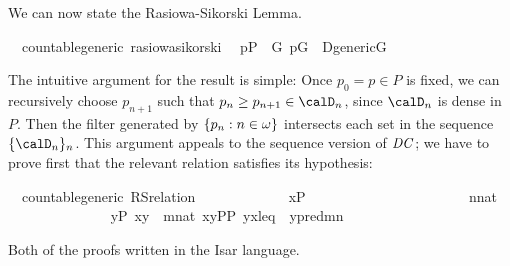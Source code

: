 We can now state the Rasiowa-Sikorski Lemma.
\begin{isabelle}%
\isamarkupfalse%
\ {\isacharparenleft}\ countable{\isacharunderscore}generic{\isacharparenright}\ rasiowa{\isacharunderscore}sikorski{\isacharcolon}\isanewline
\ \ {\isachardoublequoteopen}p{\isasymin}P\ {\isasymLongrightarrow}\ {\isasymexists}G{\isachardot}\ p{\isasymin}G\ {\isasymand}\ D{\isacharunderscore}generic{\isacharparenleft}G{\isacharparenright}{\isachardoublequoteclose}
\end{isabelle}

The intuitive argument for the result is simple: Once $p_0=p\in P$ is
fixed, we can recursively choose $p_{n+1}$ such that 
$p_n \geq p_{n+1}\in \calD_n$, since $\calD_n$ is dense in $P$. Then
the filter generated by $\{p_n : n\in \omega\}$ intersects each set in
the sequence $\{\calD_n\}_n$. This argument appeals to the sequence
version of $\mathit{DC}$; we have to prove first that the relevant relation
satisfies its hypothesis:

\begin{isabelle}%
\isamarkupfalse%
\ {\isacharparenleft}\ countable{\isacharunderscore}generic{\isacharparenright}\ RS{\isacharunderscore}relation{\isacharcolon}\isanewline
\ \ \isanewline
\ \ \ \ \ \ \ \ {}{\isacharcolon}\ \ {\isachardoublequoteopen}x{\isasymin}P{\isachardoublequoteclose}\isanewline
\ \ \ \ \ \ \ \ \ \ \ \ \isanewline
\ \ \ \ \ \ \ \ {}{\isacharcolon}\ \ {\isachardoublequoteopen}n{\isasymin}nat{\isachardoublequoteclose}\isanewline
\ \ \isanewline
\ \ \ \ \ \ \ \ \ \ \ \ {\isachardoublequoteopen}{\isasymexists}y{\isasymin}P{\isachardot}\ {\isasymlangle}x{\isacharcomma}y{\isasymrangle}\ {\isasymin}\ {\isacharparenleft}{\isasymlambda}m{\isasymin}nat{\isachardot}\ {\isacharbraceleft}{\isasymlangle}x{\isacharcomma}y{\isasymrangle}{\isasymin}P{\isacharasterisk}P{\isachardot}\ {\isasymlangle}y{\isacharcomma}x{\isasymrangle}{\isasymin}leq\ {\isasymand}\ y{\isasymin}{\isasymD}{\isacharbackquote}{\isacharparenleft}pred{\isacharparenleft}m{\isacharparenright}{\isacharparenright}{\isacharbraceright}{\isacharparenright}{\isacharbackquote}n{\isachardoublequoteclose}
\end{isabelle}
%
Both of the proofs written in the Isar language.



